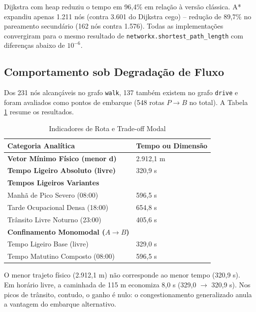 \documentclass[conference]{IEEEtran}
\begin{document}
Dijkstra com heap reduziu o tempo em 96,4\% em relação à versão clássica. A* expandiu apenas 1.211 nós (contra 3.601 do Dijkstra cego) -- redução de 89,7\% no pareamento secundário (162 nós contra 1.576). Todas as implementações convergiram para o mesmo resultado de \texttt{networkx.shortest\_path\_length} com diferenças abaixo de $10^{-6}$.

\subsection{Comportamento sob Degradação de Fluxo}

Dos 231 nós alcançáveis no grafo \texttt{walk}, 137 também existem no grafo \texttt{drive} e foram avaliados como pontos de embarque (548 rotas $P \to B$ no total). A Tabela \ref{tab:rotas} resume os resultados.

\begin{table}[htbp]
\centering
\footnotesize
\setlength{\tabcolsep}{3pt}
\caption{Indicadores de Rota e Trade-off Modal}
\label{tab:rotas}
\begin{tabular}{@{}>{\raggedright\arraybackslash}p{3.8cm}l@{}}
\toprule
\textbf{Categoria Analítica} & \textbf{Tempo ou Dimensão} \\ \midrule
\textbf{Vetor Mínimo Físico (menor d)} & 2.912,1 m \\
\textbf{Tempo Ligeiro Absoluto (livre)} & 320,9 s \\ \midrule
\textbf{Tempos Ligeiros Variantes} & \\
Manhã de Pico Severo (08:00) & 596,5 s \\
Tarde Ocupacional Densa (18:00) & 654,8 s \\
Trânsito Livre Noturno (23:00) & 405,6 s \\ \midrule
\textbf{Confinamento Monomodal ($A \to B$)} & \\
Tempo Ligeiro Base (livre) & 329,0 s \\
Tempo Matutino Composto (08:00) & 596,5 s \\ \bottomrule
\end{tabular}
\end{table}

O menor trajeto físico (2.912,1 m) não corresponde ao menor tempo (320,9 s). Em horário livre, a caminhada de 115 m economiza 8,0 s (329,0 $\to$ 320,9 s). Nos picos de trânsito, contudo, o ganho é nulo: o congestionamento generalizado anula a vantagem do embarque alternativo.

\end{document}
